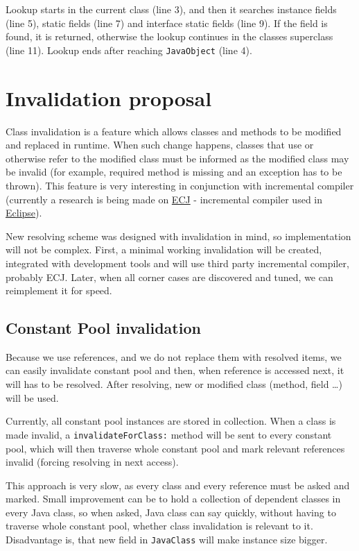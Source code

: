 \documentclass[11pt,twoside,a4paper]{book}
\begin{document}
Lookup starts in the current class (line 3), and then it searches instance fields (line 5), static fields (line 7) and interface static fields (line 9).
If the field is found, it is returned, otherwise the lookup continues in the classes superclass (line 11).
Lookup ends after reaching \texttt{JavaObject} (line 4).

\section{Invalidation proposal}
\label{sec:invalidation}

Class invalidation is a feature which allows classes and methods to be modified and replaced in runtime. 
When such change happens, classes that use or otherwise refer to the modified class must be informed as the modified class may be invalid (for example, required method is missing and an exception has to be thrown).
This feature is very interesting in conjunction with incremental compiler (currently a research is being made on \href{http://www.eclipse.org/jdt/core/}{ECJ} - incremental compiler used in \href{http://www.eclipse.org}{Eclipse}).

New resolving scheme was designed with invalidation in mind, so implementation will not be complex.
First, a minimal working invalidation will be created, integrated with development tools and will use third party incremental compiler, probably ECJ.
Later, when all corner cases are discovered and tuned, we can reimplement it for speed.

\subsection{Constant Pool invalidation}

Because we use references, and we do not replace them with resolved items, we can easily invalidate constant pool and then, when reference is accessed next, it will has to be resolved.
After resolving, new or modified class (method, field \ldots) will be used.

Currently, all constant pool instances are stored in collection.
When a class is made invalid, a \texttt{invalidateForClass:} method will be sent to every constant pool, which will then traverse whole constant pool and mark relevant references invalid (forcing resolving in next access).

This approach is very slow, as every class and every reference must be asked and marked.
Small improvement can be to hold a collection of dependent classes in every Java class, so when asked, Java class can say quickly, without having to traverse whole constant pool, whether class invalidation is relevant to it.
Disadvantage is, that new field in \texttt{JavaClass} will make instance size bigger.
\end{document}
